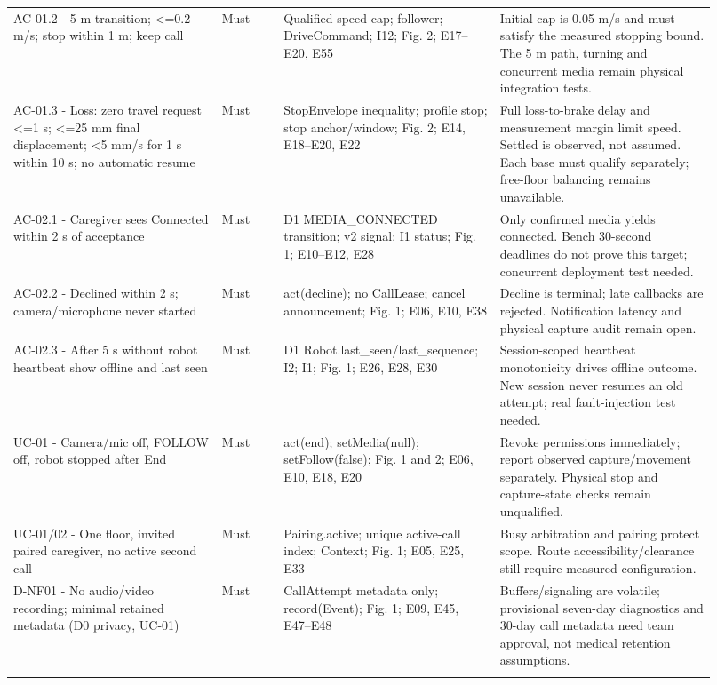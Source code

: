\documentclass[12pt,letterpaper]{article}
\begin{document}
\begin{longtable}{@{}>{\RaggedRight\arraybackslash}p{0.27\linewidth}>{\RaggedRight\arraybackslash}p{0.08\linewidth}>{\RaggedRight\arraybackslash}p{0.28\linewidth}>{\RaggedRight\arraybackslash}p{0.285\linewidth}@{}}
AC-01.2 - 5 m transition; <=0.2 m/s; stop within 1 m; keep call & Must & Qualified speed cap; follower; DriveCommand; I12; Fig. 2; E17--E20, E55 & Initial cap is 0.05 m/s and must satisfy the measured stopping bound. The 5 m path, turning and concurrent media remain physical integration tests. \\ \addlinespace[3pt]
AC-01.3 - Loss: zero travel request <=1 s; <=25 mm final displacement; <5 mm/s for 1 s within 10 s; no automatic resume & Must & StopEnvelope inequality; profile stop; stop anchor/window; Fig. 2; E14, E18--E20, E22 & Full loss-to-brake delay and measurement margin limit speed. Settled is observed, not assumed. Each base must qualify separately; free-floor balancing remains unavailable. \\ \addlinespace[3pt]
AC-02.1 - Caregiver sees Connected within 2 s of acceptance & Must & D1 MEDIA\_\allowbreak{}CONNECTED transition; v2 signal; I1 status; Fig. 1; E10--E12, E28 & Only confirmed media yields connected. Bench 30-second deadlines do not prove this target; concurrent deployment test needed. \\ \addlinespace[3pt]
AC-02.2 - Declined within 2 s; camera/microphone never started & Must & act(decline); no CallLease; cancel announcement; Fig. 1; E06, E10, E38 & Decline is terminal; late callbacks are rejected. Notification latency and physical capture audit remain open. \\ \addlinespace[3pt]
AC-02.3 - After 5 s without robot heartbeat show offline and last seen & Must & D1 Robot.last\_\allowbreak{}seen/last\_\allowbreak{}sequence; I2; I1; Fig. 1; E26, E28, E30 & Session-scoped heartbeat monotonicity drives offline outcome. New session never resumes an old attempt; real fault-injection test needed. \\ \addlinespace[3pt]
UC-01 - Camera/mic off, FOLLOW off, robot stopped after End & Must & act(end); setMedia(null); setFollow(false); Fig. 1 and 2; E06, E10, E18, E20 & Revoke permissions immediately; report observed capture/movement separately. Physical stop and capture-state checks remain unqualified. \\ \addlinespace[3pt]
UC-01/02 - One floor, invited paired caregiver, no active second call & Must & Pairing.active; unique active-call index; Context; Fig. 1; E05, E25, E33 & Busy arbitration and pairing protect scope. Route accessibility/clearance still require measured configuration. \\ \addlinespace[3pt]
D-NF01 - No audio/video recording; minimal retained metadata (D0 privacy, UC-01) & Must & CallAttempt metadata only; record(Event); Fig. 1; E09, E45, E47--E48 & Buffers/signaling are volatile; provisional seven-day diagnostics and 30-day call metadata need team approval, not medical retention assumptions. \\ \addlinespace[3pt]

\end{longtable}
\end{document}
